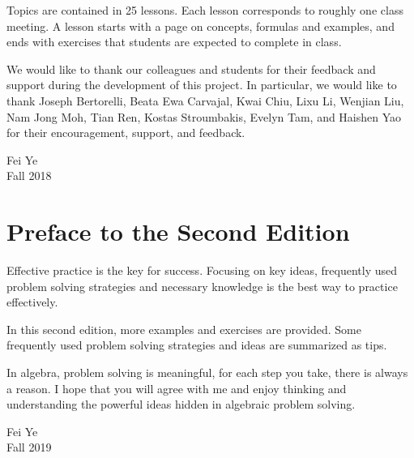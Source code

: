 Topics are contained in 25 lessons.  Each lesson corresponds to roughly one class meeting. A lesson starts with a page on concepts, formulas and examples, and ends with exercises that students are expected to complete in class.

We would like to thank our colleagues and students for their feedback and support during the development of this project.
In particular, we would like to thank 
Joseph Bertorelli,
Beata Ewa Carvajal,
Kwai Chiu,
Lixu Li,
Wenjian Liu,
Nam Jong Moh,
Tian Ren,
Kostas Stroumbakis,
Evelyn Tam,
and
Haishen Yao
for their encouragement, support, and feedback.


\begin{flushright}
	\parbox{\lengthsignature}{
		Fei Ye\\
		Fall 2018
	}
\end{flushright}

\let\clearpage\relax

\vspace*{1.5\baselineskip}

\chapter*{Preface to the Second Edition}


Effective practice is the key for success. Focusing on key ideas, frequently used problem solving strategies and necessary knowledge is the best way to practice effectively.

In this second edition, more examples and exercises are provided. Some frequently used problem solving strategies and ideas are summarized as tips.

In algebra, problem solving is meaningful, for each step you take, there is always a reason. I hope that you will agree with me and enjoy thinking and understanding the powerful ideas hidden in algebraic problem solving.


\begin{flushright}
	\parbox{\lengthsignature}{
		Fei Ye\\
		Fall 2019
	}
\end{flushright}

\renewcommand{\baselinestretch}{1.0}\normalsize
